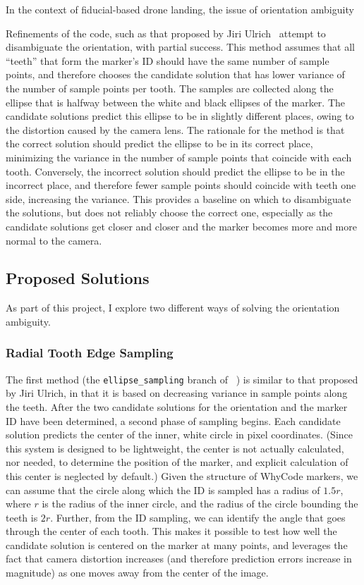 In the context of fiducial-based drone landing, the issue of orientation ambiguity

Refinements of the code, such as that proposed by Jiri Ulrich~\cite{julrich_whycon} attempt to disambiguate
the orientation, with partial success.
This method assumes that all ``teeth'' that form the marker's ID should have the same number of sample points,
and therefore chooses the candidate solution that has lower variance of the number of sample points per tooth.
The samples are collected along the ellipse that is halfway between the white and black ellipses of the marker.
The candidate solutions predict this ellipse to be in slightly different places,
owing to the distortion caused by the camera lens.
The rationale for the method is that the correct solution should predict the ellipse to be in its correct place,
minimizing the variance in the number of sample points that coincide with each tooth.
Conversely, the incorrect solution should predict the ellipse to be in the incorrect place,
and therefore fewer sample points should coincide with teeth one side, increasing the variance.
This provides a baseline on which to disambiguate the solutions, but does not reliably choose the correct one,
especially as the candidate solutions get closer and closer and the marker becomes more and more normal to the camera.

\subsection{Proposed Solutions}

As part of this project, I explore two different ways of solving the orientation ambiguity.

\subsubsection{Radial Tooth Edge Sampling}

The first method (the \texttt{ellipse\_sampling} branch of ~\cite{uzgit_whycon}) is similar to that proposed by Jiri Ulrich,
in that it is based on decreasing variance in sample points along the teeth.
After the two candidate solutions for the orientation and the marker ID have been determined,
a second phase of sampling begins.
Each candidate solution predicts the center of the inner, white circle in pixel coordinates.
(Since this system is designed to be lightweight, the center is not actually calculated, nor needed, to determine the position of the marker,
and explicit calculation of this center is neglected by default.)
Given the structure of WhyCode markers, we can assume that the circle along which the ID is sampled
has a radius of $1.5r$, where $r$ is the radius of the inner circle, and the radius of the circle bounding the teeth is $2r$.
Further, from the ID sampling, we can identify the angle that goes through the center of each tooth.
This makes it possible to test how well the candidate solution is centered on the marker at many points,
and leverages the fact that camera distortion increases (and therefore prediction errors increase in magnitude) as one moves away from the center of the image.

